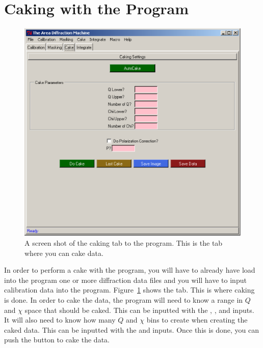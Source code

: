 \section{Caking with the Program}

\begin{figure}
    \centering
    \includegraphics[scale=.75]{figures/caking_page.eps}
    \caption{A screen shot of the caking tab to the program.
    This is the tab where you can cake data.} 
    \label{caking_page}
\end{figure}

In order to perform a cake with the program, you will have
to already have load into the program one or more
diffraction data files and you will have to input
calibration data into the program. Figure~\ref{caking_page}
shows the  tab. This is where caking is done. 
In order to cake the data, the program will need to know a range
in $Q$ and $\chi$ space that should be caked. 
This can be inputted with the , 
, and  inputs.
It will also need to know how many $Q$ and $\chi$ bins to 
create when creating the caked data. This can be inputted
with the  and  inputs.
Once this is done, you can push the  button to 
cake the data. 

